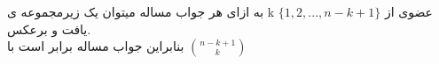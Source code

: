 به ازای هر جواب مساله میتوان یک زیرمجموعه ی k عضوی از $\{1, 2, ..., n - k + 1 \}$ یافت و برعکس.\\بنابراین جواب مساله برابر است با  \(\binom{n - k + 1}{k}\)
